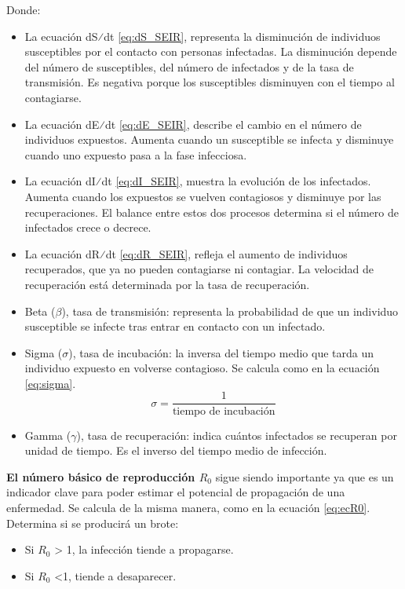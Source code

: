 Donde:
\begin{itemize}
    \item 	La ecuación dS⁄dt \eqref{eq:dS_SEIR}, representa la disminución de individuos susceptibles por el contacto con personas infectadas. La disminución depende del número de susceptibles, del número de infectados y de la tasa de transmisión. Es negativa porque los susceptibles disminuyen con el tiempo al contagiarse.
    \item 	La ecuación dE⁄dt \eqref{eq:dE_SEIR}, describe el cambio en el número de individuos expuestos. Aumenta cuando un susceptible se infecta y disminuye cuando uno expuesto pasa a la fase infecciosa.
    \item 	La ecuación dI⁄dt \eqref{eq:dI_SEIR}, muestra la evolución de los infectados. Aumenta cuando los expuestos se vuelven contagiosos y disminuye por las recuperaciones. El balance entre estos dos procesos determina si el número de infectados crece o decrece.
    \item 	La ecuación dR⁄dt \eqref{eq:dR_SEIR}, refleja el aumento de individuos recuperados, que ya no pueden contagiarse ni contagiar. La velocidad de recuperación está determinada por la tasa de recuperación.
    \item Beta ($\beta$), tasa de transmisión: representa la probabilidad de que un individuo susceptible se infecte tras entrar en contacto con un infectado. 
    \item Sigma ($\sigma$), tasa de incubación: la inversa del tiempo medio que tarda un individuo expuesto en volverse contagioso. Se calcula como en la ecuación \eqref{eq:sigma}.
    \begin{equation}
    \sigma = \frac{1}{\text{tiempo de incubación}}
    \label{eq:sigma}
    \end{equation}
    \item Gamma ($\gamma$), tasa de recuperación: indica cuántos infectados se recuperan por unidad de tiempo. Es el inverso del tiempo medio de infección.
\end{itemize}

\textbf{El número básico de reproducción $R_0$} sigue siendo importante ya que es un indicador clave para poder estimar el potencial de propagación de una enfermedad. Se calcula de la misma manera, como en la ecuación \eqref{eq:ecR0}. Determina si se producirá un brote:
\begin{itemize}
    \item 	Si $R_0$ > 1, la infección tiende a propagarse.
    \item 	Si $R_0$ <1, tiende a desaparecer.
\end{itemize}

